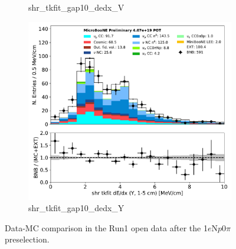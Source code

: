 \documentclass[a4paper]{article}
\newcommand{\npsel}{1$e$N$p$0$\pi$ }
\begin{document}
\begin{figure}[H]
\begin{center}
\begin{subfigure}[b]{0.3\textwidth}
    \caption{\label{fig:1eNp:dataMCRun1:shr_tkfit_gap10_dedx_V} shr\_tkfit\_gap10\_dedx\_V }
    \end{subfigure}
    \begin{subfigure}[b]{0.3\textwidth}
    \centering
    \includegraphics[width=1.00\textwidth]{1eNp/dataMCRun1/shr_tkfit_gap10_dedx_Y01152020.pdf}
    \caption{\label{fig:1eNp:dataMCRun1:shr_tkfit_gap10_dedx_Y} shr\_tkfit\_gap10\_dedx\_Y }
    \end{subfigure}
\caption{\label{fig:1eNp:dataMCRun1:shr_tkfit_gap10_dedx}Data-MC comparison in the Run1 open data after the \npsel preselection.}
\end{center}
\end{figure}
\end{document}
